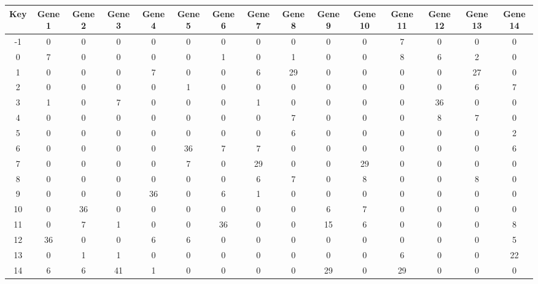 \begin{tabular}{|c|c|c|c|c|c|c|c|c|c|c|c|c|c|c|}
\hline
Key & Gene 1 & Gene 2 & Gene 3 & Gene 4 & Gene 5 & Gene 6 & Gene 7 & Gene 8 & Gene 9 & Gene 10 & Gene 11 & Gene 12 & Gene 13 & Gene 14 \\
\hline
-1 & 0 & 0 & 0 & 0 & 0 & 0 & 0 & 0 & 0 & 0 & 7 & 0 & 0 & 0 \\
0 & 7 & 0 & 0 & 0 & 0 & 1 & 0 & 1 & 0 & 0 & 8 & 6 & 2 & 0 \\
1 & 0 & 0 & 0 & 7 & 0 & 0 & 6 & 29 & 0 & 0 & 0 & 0 & 27 & 0 \\
2 & 0 & 0 & 0 & 0 & 1 & 0 & 0 & 0 & 0 & 0 & 0 & 0 & 6 & 7 \\
3 & 1 & 0 & 7 & 0 & 0 & 0 & 1 & 0 & 0 & 0 & 0 & 36 & 0 & 0 \\
4 & 0 & 0 & 0 & 0 & 0 & 0 & 0 & 7 & 0 & 0 & 0 & 8 & 7 & 0 \\
5 & 0 & 0 & 0 & 0 & 0 & 0 & 0 & 6 & 0 & 0 & 0 & 0 & 0 & 2 \\
6 & 0 & 0 & 0 & 0 & 36 & 7 & 7 & 0 & 0 & 0 & 0 & 0 & 0 & 6 \\
7 & 0 & 0 & 0 & 0 & 7 & 0 & 29 & 0 & 0 & 29 & 0 & 0 & 0 & 0 \\
8 & 0 & 0 & 0 & 0 & 0 & 0 & 6 & 7 & 0 & 8 & 0 & 0 & 8 & 0 \\
9 & 0 & 0 & 0 & 36 & 0 & 6 & 1 & 0 & 0 & 0 & 0 & 0 & 0 & 0 \\
10 & 0 & 36 & 0 & 0 & 0 & 0 & 0 & 0 & 6 & 7 & 0 & 0 & 0 & 0 \\
11 & 0 & 7 & 1 & 0 & 0 & 36 & 0 & 0 & 15 & 6 & 0 & 0 & 0 & 8 \\
12 & 36 & 0 & 0 & 6 & 6 & 0 & 0 & 0 & 0 & 0 & 0 & 0 & 0 & 5 \\
13 & 0 & 1 & 1 & 0 & 0 & 0 & 0 & 0 & 0 & 0 & 6 & 0 & 0 & 22 \\
14 & 6 & 6 & 41 & 1 & 0 & 0 & 0 & 0 & 29 & 0 & 29 & 0 & 0 & 0 \\
\hline
\end{tabular}